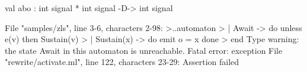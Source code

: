 \chklistingfalse
{}
\begin{ChkListingMsg}
val abo : int signal * int signal -D-> int signal
\end{ChkListingMsg}
\begin{ChkListingErr}
File "samples/zls", line 3-6, characters 2-98:
>..automaton
>  | Await -> do unless e(v) then Sustain(v)
>  | Sustain(x) -> do emit o = x done
>  end
Type warning: the state Await in this automaton is unreachable.
Fatal error: exception File "rewrite/activate.ml", line 122, characters 23-29: Assertion failed
\end{ChkListingErr}
